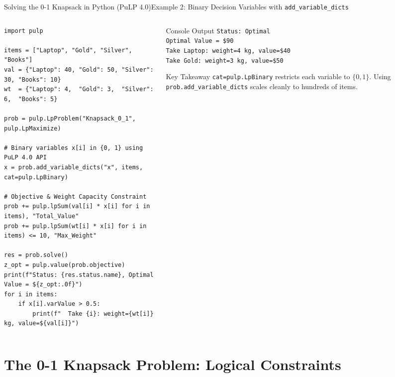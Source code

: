 \documentclass[aspectratio=169]{beamer}
\begin{document}
\begin{frame}[fragile]{Solving the 0-1 Knapsack in Python (PuLP 4.0)}{Example 2: Binary Decision Variables with \texttt{add\_variable\_dicts}}
\begin{columns}[T]
\begin{column}{0.58\textwidth}
\begin{lstlisting}
import pulp

items = ["Laptop", "Gold", "Silver", "Books"]
val = {"Laptop": 40, "Gold": 50, "Silver": 30, "Books": 10}
wt  = {"Laptop": 4,  "Gold": 3,  "Silver": 6,  "Books": 5}

prob = pulp.LpProblem("Knapsack_0_1", pulp.LpMaximize)

# Binary variables x[i] in {0, 1} using PuLP 4.0 API
x = prob.add_variable_dicts("x", items, cat=pulp.LpBinary)

# Objective & Weight Capacity Constraint
prob += pulp.lpSum(val[i] * x[i] for i in items), "Total_Value"
prob += pulp.lpSum(wt[i] * x[i] for i in items) <= 10, "Max_Weight"

res = prob.solve()
z_opt = pulp.value(prob.objective)
print(f"Status: {res.status.name}, Optimal Value = ${z_opt:.0f}")
for i in items:
    if x[i].varValue > 0.5:
        print(f"  Take {i}: weight={wt[i]} kg, value=${val[i]}")
\end{lstlisting}
\end{column}
\begin{column}{0.39\textwidth}
\begin{block}{Console Output}
\footnotesize
\texttt{Status: Optimal}\\
\texttt{Optimal Value = \$90}\\
\texttt{Take Laptop: weight=4 kg, value=\$40}\\
\texttt{Take Gold: weight=3 kg, value=\$50}
\end{block}
\begin{alertblock}{Key Takeaway}
\scriptsize
\texttt{cat=pulp.LpBinary} restricts each variable to $\{0, 1\}$. Using \texttt{prob.add\_variable\_dicts} scales cleanly to hundreds of items.
\end{alertblock}
\end{column}
\end{columns}
\end{frame}


\section{The 0-1 Knapsack Problem: Logical Constraints}
\begin{frame}\sectionpage\end{frame}
\end{document}

